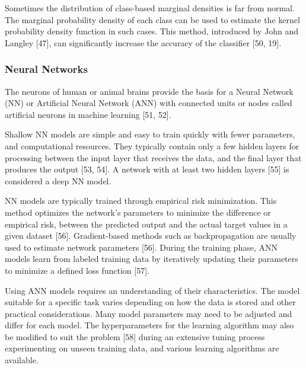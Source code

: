 \documentclass[sn-mathphys-num]{sn-jnl}%
\begin{document}
Sometimes the distribution of class-based marginal densities is far from normal. The marginal probability density of each class can be used to estimate the kernel probability density function in such cases. This method, introduced by John and Langley [47], can significantly increase the accuracy of the classifier [50, 19].

\subsubsection{Neural Networks}

The neurons of human or animal brains provide the basis for a Neural Network (NN) or Artificial Neural Network (ANN) with connected units or nodes called artificial neurons in machine learning [51, 52]. 

Shallow NN models are simple and easy to train quickly with fewer parameters, and computational resources. They typically contain only a few hidden layers for processing between the input layer that receives the data, and the final layer that produces the output [53, 54].  A network with at least two hidden layers [55] is considered a deep NN model.

NN models are typically trained through empirical risk minimization. This method optimizes the network's parameters to minimize the difference or empirical risk, between the predicted output and the actual target values in a given dataset [56]. Gradient-based methods such as backpropagation are usually used to estimate network parameters  [56]. During the training phase, ANN models learn from labeled training data by iteratively updating their parameters to minimize a defined loss function [57].

Using ANN models requires an understanding of their characteristics. The model suitable for a specific task varies depending on how the data is stored and other practical considerations. Many model parameters may need to be adjusted and differ for each model. The hyperparameters for the learning algorithm may also be modified to suit the problem [58] during an extensive tuning process experimenting on unseen training data, and various learning algorithms are available.
\end{document}

